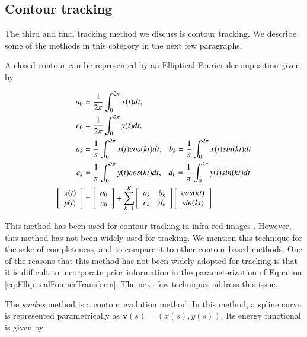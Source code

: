 \subsection{Contour tracking}
The third and final tracking method we discuss is contour tracking.  We describe some of the methods in this category in the next few paragraphs.

A closed contour can be represented by an Elliptical Fourier decomposition \cite{1982_JNL_EllipticalFourier_Kuhl} given by

\begin{align}
\centering
	\label{eq:EllipticalFourierTransform}
	a_0&=\frac{1}{2\pi}\int_0^{2 \pi}x(t)dt,       \notag\\ 
	c_0&=\frac{1}{2\pi}\int_0^{2 \pi}y(t)dt,       \notag\\ 
	a_k&=\frac{1}{\pi}\int_0^{2 \pi}x(t)cos(kt)dt,   \ \ \   b_k=\frac{1}{\pi}\int_0^{2 \pi}x(t)sin(kt)dt    \notag\\
	c_k&=\frac{1}{\pi}\int_0^{2 \pi}y(t)cos(kt)dt,    \ \ \  d_k=\frac{1}{\pi}\int_0^{2 \pi}y(t)sin(kt)dt    \notag\\
	\left[ \begin{array}{ccc}x(t) \\y(t) \end{array}\right] &=\left[ \begin{array}{ccc}a_0\\c_0 \end{array}\right] + \sum_{k=1}^K \left[ \begin{array}{ccc}a_k & b_k\\c_k & d_k \end{array}\right]\left[ \begin{array}{ccc}cos(kt)\\sin(kt) \end{array}\right]
\end{align}

This method has been used for contour tracking in infra-red images \cite{2010_CNF_VehicleContour_Aslam}.  However, this method has not been widely used for tracking.  We mention this technique for the sake of completeness, and to compare it to other contour based methods.  One of the reasons that this method has not been widely adopted for tracking is that it is difficult to incorporate prior information in the parameterization of Equation \ref{eq:EllipticalFourierTransform}.  The next few techniques address this issue.

The \emph{snakes} method \cite{1988_JNL_Snakes_Kass} is a contour evolution method.  In this method, a spline curve is represented parametrically as $\mathbf{v}(s) = (x(s), y(s))$.  Its energy functional is given by

